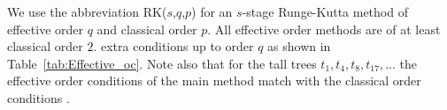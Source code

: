 We use the abbreviation RK($s$,$q$,$p$) for an $s$-stage Runge-Kutta method of effective order $q$ and classical order $p$.
All effective order methods are of at least classical order $2$.
extra conditions up to order $q$ as shown in Table~\ref{tab:Effective_oc}.
Note also that for the tall trees $t_1, t_4, t_8, t_{17}, \dots$ the effective
order conditions of the main method match with the classical order conditions \cite{Butcher2008_book}.



